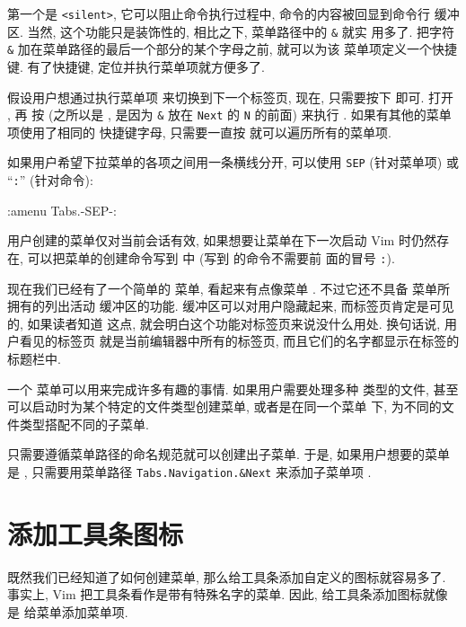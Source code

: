 第一个是 \texttt{<silent>}, 它可以阻止命令执行过程中, 命令的内容被回显到命令行
缓冲区. 当然, 这个功能只是装饰性的, 相比之下, 菜单路径中的 \verb'&' 就实
用多了. 把字符 \verb'&' 加在菜单路径的最后一个部分的某个字母之前, 就可以为该
菜单项定义一个快捷键. 有了快捷键, 定位并执行菜单项就方便多了.
\begin{center}
\end{center}
假设用户想通过执行菜单项  来切换到下一个标签页, 现在,
只需要按下  即可.  打开 , 再
按  (之所以是 , 是因为 \verb'&' 放在 \texttt{Next} 的
\texttt{N} 的前面) 来执行 . 如果有其他的菜单项使用了相同的
快捷键字母, 只需要一直按  就可以遍历所有的菜单项.
\begin{warning}
    如果用户希望下拉菜单的各项之间用一条横线分开, 可以使用 \texttt{SEP} 
    (针对菜单项) 或 ``\texttt{:}'' (针对命令):
\begin{vimcmd}
:amenu Tabs.-SEP-:
\end{vimcmd}
用户创建的菜单仅对当前会话有效, 如果想要让菜单在下一次启动 Vim 时仍然存在,
可以把菜单的创建命令写到  中 (写到  的命令不需要前
面的冒号 \texttt{:}).
\end{warning}
现在我们已经有了一个简单的  菜单, 看起来有点像菜单
. 不过它还不具备  菜单所拥有的列出活动
缓冲区的功能. 缓冲区可以对用户隐藏起来, 而标签页肯定是可见的, 如果读者知道
这点, 就会明白这个功能对标签页来说没什么用处. 换句话说, 用户看见的标签页
就是当前编辑器中所有的标签页, 而且它们的名字都显示在标签的标题栏中.

一个  菜单可以用来完成许多有趣的事情. 如果用户需要处理多种
类型的文件, 甚至可以启动时为某个特定的文件类型创建菜单, 或者是在同一个菜单
下, 为不同的文件类型搭配不同的子菜单.

只需要遵循菜单路径的命名规范就可以创建出子菜单. 于是, 如果用户想要的菜单是
, 只需要用菜单路径
\texttt{Tabs.Navigation.\&Next} 来添加子菜单项 .

\section{添加工具条图标}
\label{sec:adding_toolbar_icons}

既然我们已经知道了如何创建菜单, 那么给工具条添加自定义的图标就容易多了.
事实上, Vim 把工具条看作是带有特殊名字的菜单. 因此, 给工具条添加图标就像是
给菜单添加菜单项.

